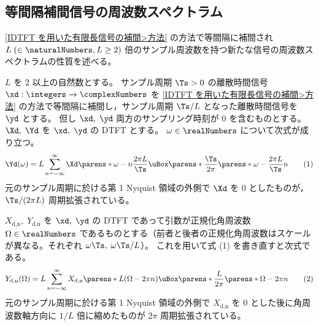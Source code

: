         \subsection{等間隔補間信号の周波数スペクトラム}
            \newcommand*{\Xdn}{X_\text{d,n}}
            \newcommand*{\Ydn}{Y_\text{d,n}}
            \ref{IDTFT を用いた有限長信号の補間>方法} の方法で等間隔に補間され $L\;(\in\naturalNumbers,L\geq 2)$ 倍のサンプル周波数を持つ新たな信号の周波数スペクトラムの性質を述べる。
            \begin{shadebox}
                $L$ を 2 以上の自然数とする。
                サンプル周期 $\Ts>0$ の離散時間信号 $\xd:\integers\to\complexNumbers$ を \ref{IDTFT を用いた有限長信号の補間>方法} の方法で等間隔に補間し，サンプル周期 $\Ts/L$ となった離散時間信号を $\yd$ とする。
                但し $\xd,\;\yd$ 両方のサンプリング時刻が 0 を含むものとする。
                $\Xd,\;\Yd$ を $\xd,\;\yd$ の DTFT とする。
                $\omega\in\realNumbers$ について次式が成り立つ。
                \[ \Yd(\omega) = L\sum_{n=-\infty}^\infty \Xd\parens*{\omega-n\frac{2\pi L}{\Ts}}\uBox\parens*{\frac{\Ts}{2\pi}\parens*{\omega-\frac{2\pi L}{\Ts}n}} \tag{1} \]
                元のサンプル周期に於ける第 1 Nyquist 領域の外側で $\Xd$ を 0 としたものが， $\Ts/(2\pi L)$ 周期拡張されている。
                \par
                $\Xdn,\;\Ydn$ を $\xd,\;\yd$ の DTFT であって引数が正規化角周波数 $\Omega\in\realNumbers$ であるものとする（前者と後者の正規化角周波数はスケールが異なる。それぞれ $\omega\Ts,\;\omega\Ts/L$）。
                これを用いて式 (1) を書き直すと次式である。
                \[ \Ydn(\Omega) = L\sum_{n=-\infty}^\infty \Xdn\parens*{L(\Omega-2\pi n)}\uBox\parens*{\frac{L}{2\pi}\parens*{\Omega-2\pi n}} \tag{2} \]
                元のサンプル周期に於ける第 1 Nyquist 領域の外側で $\Xdn$ を 0 とした後に角周波数軸方向に $1/L$ 倍に縮めたものが $2\pi$ 周期拡張されている。
            \end{shadebox}
